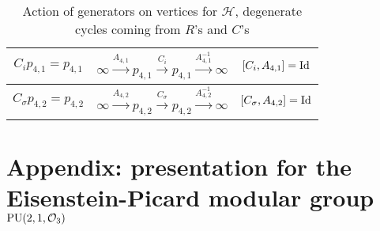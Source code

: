 \documentclass{article}[12pt]
\begin{document}
\begin{table}[h]
\begin{center}
{\begin{tabular}{|c|c|c|}


$C_i p_{4,1}=p_{4,1}$ & $\infty \xrightarrow{A_{4,1}} p_{4,1} \xrightarrow{C_i} p_{4,1} \xrightarrow{A_{4,1}^{-1}}  \infty$& $[C_i,A_{4,1}]={\rm Id}$\\
\hline

$C_\sigma p_{4,2}=p_{4,2}$ & $\infty \xrightarrow{A_{4,2}} p_{4,2} \xrightarrow{C_\sigma} p_{4,2} \xrightarrow{A_{4,2}^{-1}}  \infty$& $[C_\sigma,A_{4,2}]={\rm Id}$\\
\hline



\end{tabular}
}
\end{center}
\caption{Action of generators on vertices for $\mathcal{H}$, degenerate cycles coming from $R$'s and $C$'s}
\end{table}




\section{Appendix: presentation for the Eisenstein-Picard modular group ${\rm PU}(2,1,\mathcal{O}_3)$}
\end{document}
